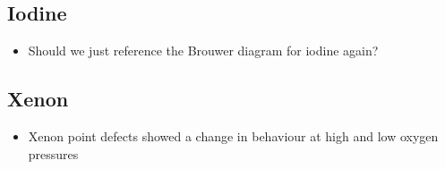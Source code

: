 \subsection{Iodine}

\begin{itemize}
\item Should we just reference the Brouwer diagram for iodine again? 
\end{itemize}

\subsection{Xenon}

\begin{itemize}
\item Xenon point defects showed a change in behaviour at high and low oxygen pressures
\end{itemize}

